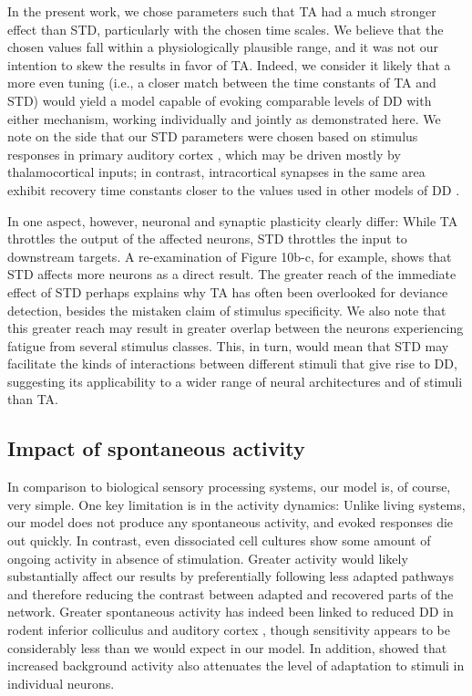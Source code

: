\documentclass[9pt,lineno,onehalfspacing]{elife}
\begin{document}
In the present work, we chose parameters such that TA had a much stronger effect than STD, particularly with the chosen time scales. We believe that the chosen values fall within a physiologically plausible range, and it was not our intention to skew the results in favor of TA. Indeed, we consider it likely that a more even tuning (i.e., a closer match between the time constants of TA and STD) would yield a model capable of evoking comparable levels of DD with either mechanism, working individually and jointly as demonstrated here. We note on the side that our STD parameters were chosen based on stimulus responses in primary auditory cortex \citep{David2013-cw,Pennington2020-ua}, which may be driven mostly by thalamocortical inputs; in contrast, intracortical synapses in the same area exhibit recovery time constants closer to the values used in other models of DD \citep{Asari2009-vu,Levy2011-af}.

In one aspect, however, neuronal and synaptic plasticity clearly differ: While TA throttles the output of the affected neurons, STD throttles the input to downstream targets. A re-examination of Figure 10b-c, for example, shows that STD affects more neurons as a direct result. The greater reach of the immediate effect of STD perhaps explains why TA has often been overlooked for deviance detection, besides the mistaken claim of stimulus specificity. We also note that this greater reach may result in greater overlap between the neurons experiencing fatigue from several stimulus classes. This, in turn, would mean that STD may facilitate the kinds of interactions between different stimuli that give rise to DD, suggesting its applicability to a wider range of neural architectures and of stimuli than TA.

\subsection{Impact of spontaneous activity}

In comparison to biological sensory processing systems, our model is, of course, very simple. One key limitation is in the activity dynamics: Unlike living systems, our model does not produce any spontaneous activity, and evoked responses die out quickly. In contrast, even dissociated cell cultures show some amount of ongoing activity in absence of stimulation. Greater activity would likely substantially affect our results by preferentially following less adapted pathways and therefore reducing the contrast between adapted and recovered parts of the network. Greater spontaneous activity has indeed been linked to reduced DD in rodent inferior colliculus \citep{Duque2012-vx, Duque2015-eu} and auditory cortex \citep{Klein2014-op}, though sensitivity appears to be considerably less than we would expect in our model. In addition, \cite{Abolafia2011-ig} showed that increased background activity also attenuates the level of adaptation to stimuli in individual neurons.
\end{document}
